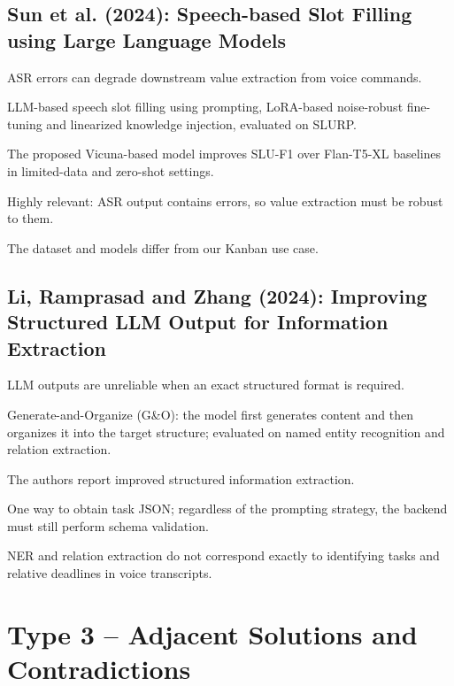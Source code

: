 \documentclass[11pt,a4paper]{article}
\newenvironment{sourceinfo}{\begin{description}[leftmargin=0pt,labelsep=0.5em,font=\normalfont\bfseries]}{\end{description}}
\newcommand{\source}[2]{\subsection{\texorpdfstring{#1~\cite{#2}}{#1}}}
\begin{document}
\source{Sun et al. (2024): Speech-based Slot Filling using Large Language Models}{sun2024speech}
\begin{sourceinfo}
  \item[Problem.] ASR errors can degrade downstream value extraction from voice commands.
  \item[Method.] LLM-based speech slot filling using prompting, LoRA-based noise-robust fine-tuning and linearized knowledge injection, evaluated on SLURP.
  \item[Reported findings.] The proposed Vicuna-based model improves SLU-F1 over Flan-T5-XL baselines in limited-data and zero-shot settings.
  \item[Relevance.] Highly relevant: ASR output contains errors, so value extraction must be robust to them.
  \item[Limitation.] The dataset and models differ from our Kanban use case.
\end{sourceinfo}

\source{Li, Ramprasad and Zhang (2024): Improving Structured LLM Output for Information Extraction}{li2024simple}
\begin{sourceinfo}
  \item[Problem.] LLM outputs are unreliable when an exact structured format is required.
  \item[Method.] Generate-and-Organize (G\&O): the model first generates content and then organizes it into the target structure; evaluated on named entity recognition and relation extraction.
  \item[Reported findings.] The authors report improved structured information extraction.
  \item[Relevance.] One way to obtain task JSON; regardless of the prompting strategy, the backend must still perform schema validation.
  \item[Limitation.] NER and relation extraction do not correspond exactly to identifying tasks and relative deadlines in voice transcripts.
\end{sourceinfo}

\section{Type 3 -- Adjacent Solutions and Contradictions}
\end{document}
